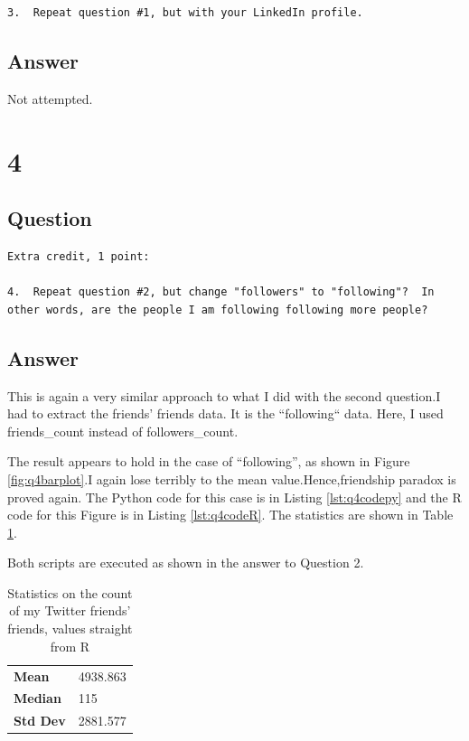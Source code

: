 \documentclass[letterpaper,11pt]{article}
\begin{document}
\begin{verbatim}
3.  Repeat question #1, but with your LinkedIn profile.
\end{verbatim}

\newpage
\subsection*{Answer}

Not attempted.

\newpage
\section*{4}

\subsection*{Question}

\begin{verbatim}
Extra credit, 1 point:

4.  Repeat question #2, but change "followers" to "following"?  In
other words, are the people I am following following more people?
\end{verbatim}

\newpage
\subsection*{Answer}
This is again a very similar approach to what I did with the second question.I had to extract the friends’ friends data. It is the ``following`` data. Here, I used friends\_count instead of followers\_count.    

The result appears to hold in the case of ``following'', as shown in Figure \ref{fig:q4barplot}.I again lose terribly to the mean value.Hence,friendship paradox is proved again.  The Python code for this case is in Listing \ref{lst:q4codepy} and the R code for this Figure is in Listing \ref{lst:q4codeR}.  The statistics are shown in Table \ref{tab:q4statistics}.

Both scripts are executed as shown in the answer to Question 2.

\begin{table}
\begin{tabular}{ l l }
\hline
\textbf{Mean} & 4938.863 \\
\textbf{Median} & 115 \\
\textbf{Std Dev} &  2881.577 \\
\hline
\end{tabular}
\caption{Statistics on the count of my Twitter friends' friends, values straight from R}
\label{tab:q4statistics}
\end{table}
\end{document}
